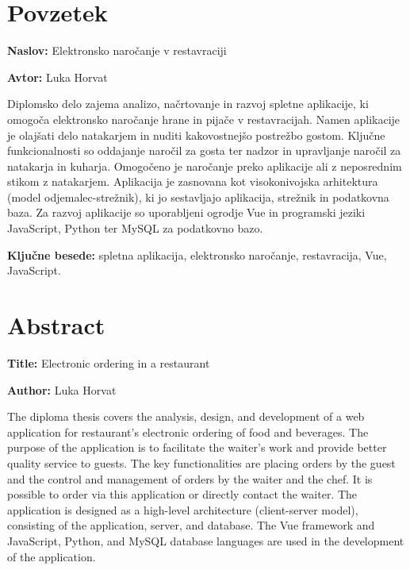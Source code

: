 \documentclass[a4paper, 12pt]{book}
\newcommand{\ttitle}{Elektronsko naročanje v restavraciji}
\newcommand{\ttitleEn}{Electronic ordering in a restaurant}
\newcommand{\tauthor}{Luka Horvat}
\newcommand{\tkeywords}{spletna aplikacija, elektronsko naročanje, restavracija, Vue, JavaScript}
\newcommand{\clearemptydoublepage}{\newpage{\pagestyle{empty}\cleardoublepage}}
\begin{document}
\clearemptydoublepage

\chapter*{Povzetek}

\noindent\textbf{Naslov:} \ttitle
\bigskip

\noindent\textbf{Avtor:} \tauthor
\bigskip


\noindent 
Diplomsko delo zajema analizo, načrtovanje in razvoj spletne aplikacije, ki omogoča elektronsko naročanje hrane in pijače v restavracijah. Namen aplikacije je olajšati delo natakarjem in nuditi kakovostnejšo postrežbo gostom. Ključne funkcionalnosti so oddajanje naročil za gosta ter nadzor in upravljanje naročil za natakarja in kuharja. Omogočeno je naročanje preko aplikacije ali z neposrednim stikom z natakarjem. Aplikacija je zasnovana kot visokonivojska arhitektura (model odjemalec-strežnik), ki jo sestavljajo aplikacija, strežnik in podatkovna baza. Za razvoj aplikacije so uporabljeni ogrodje Vue in programski jeziki JavaScript, Python ter MySQL za podatkovno bazo.
\bigskip

\noindent\textbf{Ključne besede:} \tkeywords.
\clearemptydoublepage

\chapter*{Abstract}

\noindent\textbf{Title:} \ttitleEn
\bigskip

\noindent\textbf{Author:} \tauthor
\bigskip

\noindent The diploma thesis covers the analysis, design, and development of a web application for restaurant's electronic ordering of food and beverages. The purpose of the application is to facilitate the waiter's work and provide better quality service to guests. The key functionalities are placing orders by the guest and the control and management of orders by the waiter and the chef. It is possible to order via this application or directly contact the waiter. The application is designed as a high-level architecture (client-server model), consisting of the application, server, and database. The Vue framework and JavaScript, Python, and MySQL database languages are used in the development of the application.
\bigskip
\end{document}
